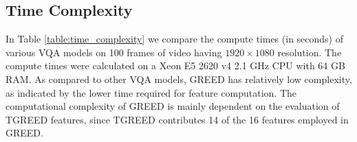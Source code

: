 \documentclass[journal]{IEEEtran}
\begin{document}
\begin{table*}[t]
	\caption{SROCC performance comparison of HFR-VMAF for individual frame rates on the LIVE-YT-HFR Database. In each column the best value is marked in boldface.}
	\label{Table:HFR_VMAF}
	\centering
	\footnotesize
\end{table*}

\subsection{Time Complexity}
In Table \ref{table:time_complexity} we compare the compute times (in seconds) of various VQA models on 100 frames of video having $1920 \times 1080$ resolution. The compute times were calculated on a Xeon E5 2620 v4 2.1 GHz CPU with 64 GB RAM. As compared to other VQA models, GREED has relatively low complexity, as indicated by the lower time required for feature computation. The computational complexity of GREED is mainly dependent on the evaluation of TGREED features, since TGREED contributes 14 of the 16 features employed in GREED. 
\end{document}
